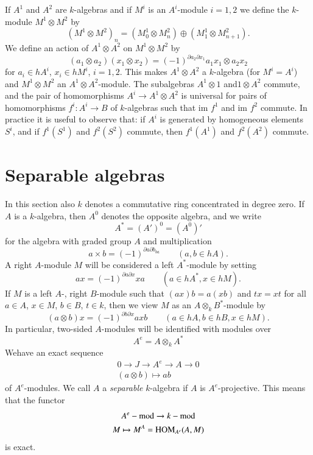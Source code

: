 If $A^1$ and $A^2$ are $k$-algebras and if $M^i$ is an $A^i$-module $i
= 1, 2$ we define the $k$-module $M^1 \otimes M^2$ by  
$$
(M^1 \otimes M^2)_n = (M^1_0 \otimes M^2_n ) \oplus (M^1_1 \otimes
M^2_{n +1}).  
$$
We define an action of $A^1 \otimes A^2$ on $M^1 \otimes M^2$ by  
$$
(a_1 \otimes a_2) (x_1 \otimes x_2) = (-1)^{ \partial a_2 \partial
  x_1} a_1 x_1 \otimes a_2 x_2 
$$
for $a_i \in h A^i $, $x_i \in hM^i$, $ i = 1, 2$. This makes $A^1
\otimes A^2$ a $k$-algebra (for $M^i = A^i$) and $M^1 \otimes M^2$ an
$A^1 \otimes A^2$-module. The subalgebras $A^1 \otimes 1$
and\pageoriginale $1 
\otimes A^2$ commute, and the pair of homomorphisms $A^i \to A^1
\otimes A^2$ is universal for pairs of homomorphisms $f^i : A^i \to B$
of $k$-algebras such that im $f^1$ and im $f^2$ commute. In practice
it is useful to observe that: if $A^i$ is generated by homogeneous
elements $S^i$, and if $f^1 (S^1)$ and $f^2 (S^2)$ commute, then $f^1
(A^1)$ and $f^2 (A^2)$ commute.  


\section{Separable algebras}\label{chap4:sec2}%

In this section also $k$ denotes a commutative ring concentrated in degree
zero. If $A$ is a $k$-algebra, then $A^0$ denotes the opposite
algebra, and we write  
$$
A^* = (A ' )^0 = (A^0)'
$$
for the algebra with graded group $A$ and multiplication 
$$
a \times b = (-1) ^{ \partial a \partial b_{ba}} \qquad (a, b \in hA).  
$$
A right $A$-module $M$ will be considered a left $A^*$-module by
setting  
$$
ax = (-1)^{\partial a \partial x}xa \qquad (a \in h A^*, x \in h M). 
$$
If $M$ is a left $A$-, right $B$-module such that $(ax)b = a (xb)$ and
$tx = xt$ for all $a \in A$, $x \in M$, $b \in B$, $t \in k$, then we
view $M$ as an $A \otimes_k B^*$-module by  
$$
(a \otimes b) x = (-1)^{\partial b \partial x } axb \qquad (a \in 
hA, b \in h B, x \in hM).  
$$
In particular, two-sided $A$-modules will be identified with modules 
over  
$$
A^e = A \otimes_k A^*
$$
We\pageoriginale have an exact sequence 
\begin{gather*}
0 \to J \to A^e \to A \to 0\\
(a\otimes b)  \mapsto ab 
\end{gather*}
of $A^e$-modules. We call $A$ a \textit{separable} $k$-algebra if $A$
is $A^e$-projective. This means that the functor  
\begin{gather*}
A^e - {\rm mod} \to k - {\rm mod} \\ 
M \mapsto M^A = {\rm HOM}_{A^e} (A, M)
\end{gather*}
is exact. 

